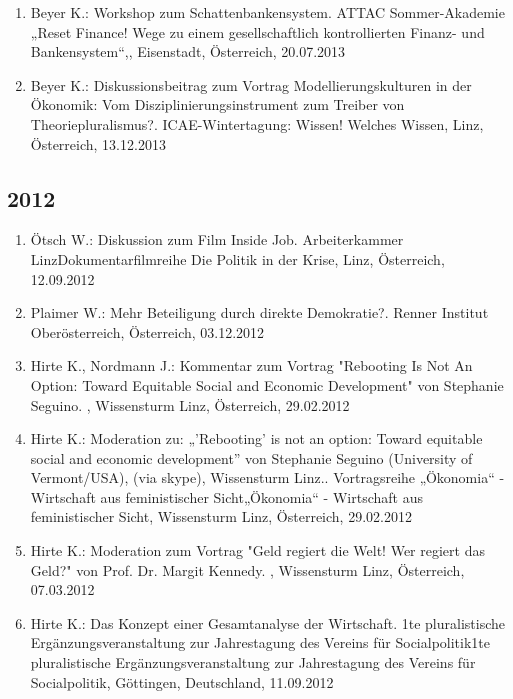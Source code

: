 \begin{enumerate}
	\item Beyer K.: Workshop zum Schattenbankensystem. ATTAC Sommer-Akademie „Reset Finance! Wege zu einem gesellschaftlich kontrollierten Finanz- und Bankensystem“,, Eisenstadt, Österreich, 20.07.2013
	\item Beyer K.: Diskussionsbeitrag zum Vortrag Modellierungskulturen in der Ökonomik: Vom Disziplinierungsinstrument zum Treiber von Theoriepluralismus?. ICAE-Wintertagung: Wissen! Welches Wissen, Linz, Österreich, 13.12.2013
\end{enumerate}
\subsection*{2012}

\begin{enumerate}
	\item Ötsch W.: Diskussion zum Film Inside Job. Arbeiterkammer LinzDokumentarfilmreihe Die Politik in der Krise, Linz, Österreich, 12.09.2012
	\item Plaimer W.: Mehr Beteiligung durch direkte Demokratie?. Renner Institut Oberösterreich, Österreich, 03.12.2012
	\item Hirte K., Nordmann J.: Kommentar zum Vortrag "Rebooting Is Not An Option: Toward Equitable Social and Economic Development" von Stephanie Seguino. , Wissensturm Linz, Österreich, 29.02.2012
	\item Hirte K.: Moderation zu: „’Rebooting’ is not an option: Toward equitable social and economic development” von Stephanie Seguino (University of Vermont/USA), (via skype), Wissensturm Linz.. Vortragsreihe „Ökonomia“ - Wirtschaft aus feministischer Sicht„Ökonomia“ - Wirtschaft aus feministischer Sicht, Wissensturm Linz, Österreich, 29.02.2012
	\item Hirte K.: Moderation zum Vortrag "Geld regiert die Welt! Wer regiert das Geld?" von Prof. Dr. Margit Kennedy. , Wissensturm Linz, Österreich, 07.03.2012
	\item Hirte K.: Das Konzept einer Gesamtanalyse der Wirtschaft. 1te pluralistische Ergänzungsveranstaltung zur Jahrestagung des Vereins für Socialpolitik1te pluralistische Ergänzungsveranstaltung zur Jahrestagung des Vereins für Socialpolitik, Göttingen, Deutschland, 11.09.2012
\end{enumerate}

